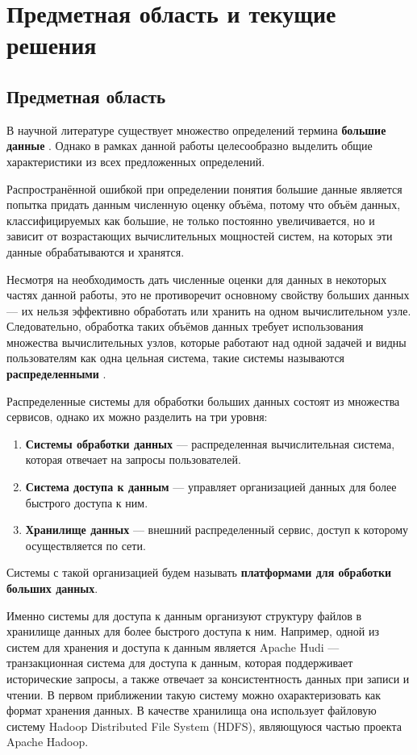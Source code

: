 \section{Предметная область и текущие решения}
\subsection{Предметная область}

В научной литературе существует множество определений термина \textbf{большие данные} \cite{Bigdata_a_review, Bigdata_an_introduction, Challenges_of_big_data_analysis}. Однако в рамках данной работы целесообразно выделить общие характеристики из всех предложенных определений. 

Распространённой ошибкой при определении понятия большие данные является попытка придать данным численную оценку объёма, потому что объём данных, классифицируемых как большие, не только постоянно увеличивается, но и зависит от возрастающих вычислительных мощностей систем, на которых эти данные обрабатываются и хранятся. 

Несмотря на необходимость дать численные оценки для данных в некоторых частях данной работы, это не противоречит основному свойству больших данных --- их нельзя эффективно обработать или хранить на одном вычислительном узле. Следовательно, обработка таких объёмов данных требует использования множества вычислительных узлов, которые работают над одной задачей и видны пользователям как одна цельная система, такие системы называются \textbf{распределенными} \cite{Time_clocks_and_the_ordering_of_events_in_a_distributed_system}.

Распределенные системы для обработки больших данных состоят из множества сервисов, однако их можно разделить на три уровня: \cite{Spatial_big_data_architecture}
\begin{enumerate}
    \item \textbf{Системы обработки данных} --- распределенная вычислительная система, которая отвечает на запросы пользователей.
    \item \textbf{Система доступа к данным} --- управляет организацией данных для более быстрого доступа к ним.
    \item \textbf{Хранилище данных} --- внешний распределенный сервис, доступ к которому осуществляется по сети.
\end{enumerate}
Системы с такой организацией будем называть \textbf{платформами для обработки больших данных}.

Именно системы для доступа к данным организуют структуру файлов в хранилище данных для более быстрого доступа к ним. Например, одной из систем для хранения и доступа к данным является Apache Hudi --- транзакционная система для доступа к данным, которая поддерживает исторические запросы, а также отвечает за консистентность данных при записи и чтении. В первом приближении такую систему можно охарактеризовать как формат хранения данных. В качестве хранилища она использует файловую систему Hadoop Distributed File System (HDFS), являющуюся частью проекта Apache Hadoop. 

